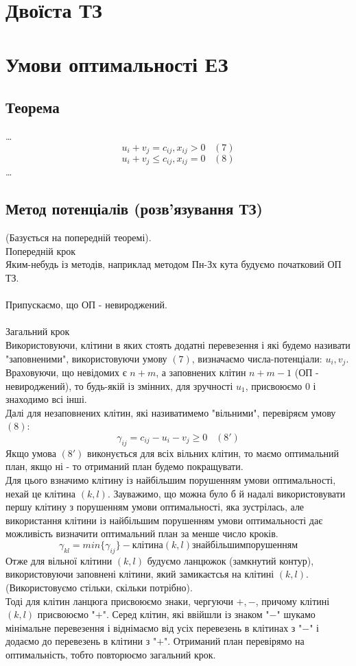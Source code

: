 \documentclass[12pt]{book}
\begin{document}
\section{Двоїста ТЗ}
\section{Умови оптимальності ЕЗ}
\subsection{Теорема}
\dots
$$u_i+v_j=c_{ij},	x_{ij}>0\;\;\;(7)$$
$$u_i+v_j{\leq}c_{ij},	x_{ij}=0\;\;\;(8)$$
\dots
\subsection{Метод потенціалів (розв’язування ТЗ)}
(Базується на попередній теоремі).\\
Попередній крок\\
Яким-небудь із методів, наприклад методом Пн-Зх кута будуємо початковий ОП ТЗ.\\
\\
Припускаємо, що ОП - невироджений.\\
\\
Загальний крок\\
Використовуючи, клітини в яких стоять додатні перевезення і які будемо називати "заповненими", використовуючи умову $(7)$, визначаємо числа-потенціали: $u_i, v_j$. Враховуючи, що невідомих є $n+m$, а заповнених клітин $n+m-1$  (ОП - невироджений), то будь-якій із змінних, для зручності $u_1$, присвоюємо 0 і знаходимо всі інші.\\
Далі для незаповнених клітин, які називатимемо "вільними", перевіряєм умову $(8)$:
$$\gamma_{ij}=c_{ij}-u_i-v_j{\geq}0\;\;\;(8')$$
Якщо умова $(8')$ виконується для всіх вільних клітин, то маємо оптимальний план, якщо ні - то отриманий план будемо покращувати.\\
Для цього взначимо клітину із найбільшим порушенням умови оптимальності, нехай це клітина $(k,l)$. Зауважимо, що можна було б й надалі використовувати першу клітину з порушенням умови оптимальності, яка зустрілась, але використання клітини із найбільшим порушенням умови оптимальності дає можливість визначити оптимальний план за менше число кроків.
$$\gamma_{kl}=min\{\gamma_{ij}\} - клітина (k,l) з найбільшим порушенням$$
Отже для вільної клітини $(k,l)$ будуємо ланцюжок (замкнутий контур), використовуючи заповнені клітини, який замикаєтсья на клітині $(k,l)$. (Використовуємо стільки, скільки потрібно).\\
Тоді для клітин ланцюга присвоюємо знаки, чергуючи $+,-$, причому клітині $(k,l)$ присвоюємо "$+$". Серед клітин, які ввійшли із знаком "$-$" шукамо мінімальне перевезення і віднімаємо від усіх перевезень в клітинах з "$-$" і додаємо до перевезень в клітини з "$+$". Отриманий план перевірямо на оптимальність, тобто повторюємо загальний крок.
\end{document}
